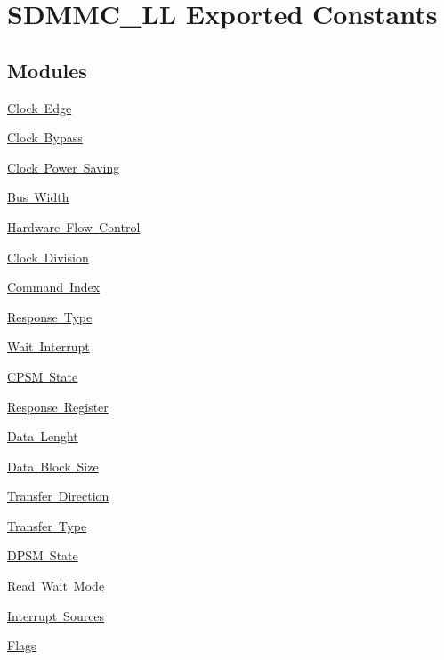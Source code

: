 \hypertarget{group___s_d_m_m_c___l_l___exported___constants}{}\section{S\+D\+M\+M\+C\+\_\+\+LL Exported Constants}
\label{group___s_d_m_m_c___l_l___exported___constants}
\subsection*{Modules}
\begin{DoxyCompactItemize}
\item 
\mbox{\hyperlink{group___s_d_m_m_c___l_l___clock___edge}{Clock Edge}}
\item 
\mbox{\hyperlink{group___s_d_m_m_c___l_l___clock___bypass}{Clock Bypass}}
\item 
\mbox{\hyperlink{group___s_d_m_m_c___l_l___clock___power___save}{Clock Power Saving}}
\item 
\mbox{\hyperlink{group___s_d_m_m_c___l_l___bus___wide}{Bus Width}}
\item 
\mbox{\hyperlink{group___s_d_m_m_c___l_l___hardware___flow___control}{Hardware Flow Control}}
\item 
\mbox{\hyperlink{group___s_d_m_m_c___l_l___clock___division}{Clock Division}}
\item 
\mbox{\hyperlink{group___s_d_m_m_c___l_l___command___index}{Command Index}}
\item 
\mbox{\hyperlink{group___s_d_m_m_c___l_l___response___type}{Response Type}}
\item 
\mbox{\hyperlink{group___s_d_m_m_c___l_l___wait___interrupt___state}{Wait Interrupt}}
\item 
\mbox{\hyperlink{group___s_d_m_m_c___l_l___c_p_s_m___state}{C\+P\+S\+M State}}
\item 
\mbox{\hyperlink{group___s_d_m_m_c___l_l___response___registers}{Response Register}}
\item 
\mbox{\hyperlink{group___s_d_m_m_c___l_l___data___length}{Data Lenght}}
\item 
\mbox{\hyperlink{group___s_d_m_m_c___l_l___data___block___size}{Data Block Size}}
\item 
\mbox{\hyperlink{group___s_d_m_m_c___l_l___transfer___direction}{Transfer Direction}}
\item 
\mbox{\hyperlink{group___s_d_m_m_c___l_l___transfer___type}{Transfer Type}}
\item 
\mbox{\hyperlink{group___s_d_m_m_c___l_l___d_p_s_m___state}{D\+P\+S\+M State}}
\item 
\mbox{\hyperlink{group___s_d_m_m_c___l_l___read___wait___mode}{Read Wait Mode}}
\item 
\mbox{\hyperlink{group___s_d_m_m_c___l_l___interrupt__sources}{Interrupt Sources}}
\item 
\mbox{\hyperlink{group___s_d_m_m_c___l_l___flags}{Flags}}
\end{DoxyCompactItemize}
